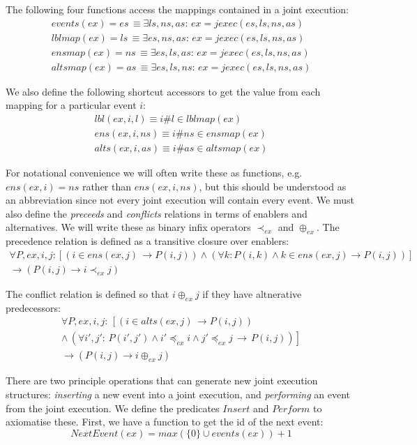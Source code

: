 The following four functions access the mappings contained in a joint
execution:\begin{gather*}
events(ex)=es\,\equiv\exists ls,ns,as:\, ex=jexec(es,ls,ns,as)\\
lblmap(ex)=ls\,\equiv\exists es,ns,as:\, ex=jexec(es,ls,ns,as)\\
ensmap(ex)=ns\,\equiv\exists es,ls,as:\, ex=jexec(es,ls,ns,as)\\
altsmap(ex)=as\,\equiv\exists es,ls,ns:\, ex=jexec(es,ls,ns,as)\end{gather*}


We also define the following shortcut accessors to get the value from
each mapping for a particular event $i$:\begin{gather*}
lbl(ex,i,l)\equiv i\#l\in lblmap(ex)\\
ens(ex,i,ns)\equiv i\#ns\in ensmap(ex)\\
alts(ex,i,as)\equiv i\#as\in altsmap(ex)\end{gather*}


For notational convenience we will often write these as functions,
e.g. $ens(ex,i)=ns$ rather than $ens(ex,i,ns)$, but this should
be understood as an abbreviation since not every joint execution will
contain every event. We must also define the \emph{preceeds} and \emph{conflicts}
relations in terms of enablers and alternatives. We will write these
as binary infix operators $\prec_{ex}$ and $\oplus_{ex}$. The precedence
relation is defined as a transitive closure over enablers:\begin{multline*}
\forall P,ex,i,j:\left[\left(i\in ens(ex,j)\,\rightarrow P(i,j)\right)\wedge\left(\forall k:P(i,k)\wedge k\in ens(ex,j)\rightarrow P(i,j)\right)\right]\\
\rightarrow\left(P(i,j)\rightarrow i\prec_{ex}j\right)\end{multline*}


The conflict relation is defined so that $i\oplus_{ex}j$ if they
have altnerative predecessors:\begin{multline*}
\forall P,ex,i,j:\,\left[\left(i\in alts(ex,j)\,\rightarrow P(i,j)\right)\right.\\
\left.\wedge\,\left(\forall i',j':\, P(i',j')\wedge i'\preceq_{ex}i\wedge j'\preceq_{ex}j\,\rightarrow\, P(i,j)\right)\right]\\
\rightarrow\left(P(i,j)\rightarrow i\oplus_{ex}j\right)\end{multline*}


There are two principle operations that can generate new joint execution
structures: \emph{inserting} a new event into a joint execution, and
\emph{performing} an event from the joint execution. We define the
predicates $Insert$ and $Perform$ to axiomatise these. First, we
have a function to get the id of the next event:\[
NextEvent(ex)=max(\{0\}\cup events(ex))+1\]


